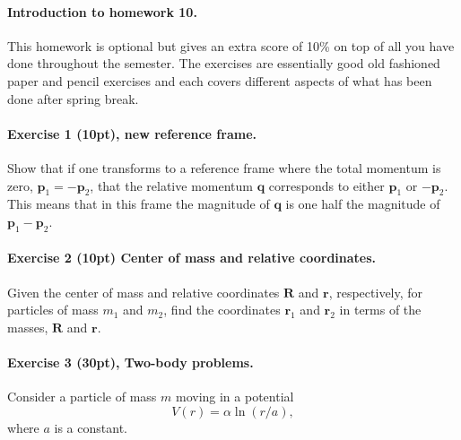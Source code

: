 \documentclass[%
oneside,                 %
final,                   %
10pt]{article}
\begin{document}
\noindent
\paragraph{Introduction to homework 10.}
This homework is optional but gives an extra score of 10\% on top of
all you have done throughout the semester. The exercises are
essentially good old fashioned paper and pencil exercises and each
covers different aspects of what has been done after spring break.

\paragraph{Exercise 1 (10pt), new reference frame.}
Show that if one transforms to a reference frame where the total
momentum is zero, $\bm{p}_1=-\bm{p}_2$, that the relative momentum
$\bm{q}$ corresponds to either $\bm{p}_1$ or $-\bm{p}_2$. This
means that in this frame the magnitude of $\bm{q}$ is one half the
magnitude of $\bm{p}_1-\bm{p}_2$.

\paragraph{Exercise 2 (10pt) Center of mass and relative coordinates.}
Given the center of mass and relative coordinates $\bm{R}$ and $\bm{r}$, respectively, for
particles of mass $m_1$ and $m_2$, find the coordinates $\bm{r}_1$
and $\bm{r}_2$ in terms of the masses, $\bm{R}$ and $\bm{r}$.


\paragraph{Exercise 3 (30pt),  Two-body problems.}
Consider a particle of mass $m$ moving in a potential
\[
V(r)=\alpha\ln(r/a),
\]
where $a$ is a constant.
\end{document}
